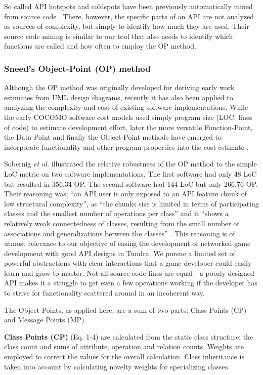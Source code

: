 \documentclass[conference]{IEEEtran}
\begin{document}
So called API hotspots and coldspots have been previously
automatically mined from source code \cite{spotweb}. There, however,
the specific parts of an API are not analyzed as sources of complexity,
but simply to identify how much they are used. Their source code
mining is similar to our tool that also needs to identify which
functions are called and how often to employ the OP method.

\subsubsection{Sneed's Object-Point (OP) method}

Although the OP method was originally developed for deriving early
work estimates from UML design diagrams, recently it has also been
applied to analyzing the complexity and cost of existing software
implementations. While the early COCOMO software cost models used
simply program size (LOC, lines of code) to estimate development
effort, later the more versatile Function-Point, the Data-Point and
finally the Object-Point methods have emerged to incorporate
functionality and other program properties into the cost estimate
\cite{henrich97repositorybased}.

Sobernig \emph{et al.} illustrated the relative robustness of the OP
method to the simple LoC metric on two software implementations. The
first software had only 48 LoC but resulted in 356.34 OP. The second
software had 144 LoC but only 266.76 OP. Their reasoning was: “an API
user is only exposed to an API feature chunk of low structural
complexity”, as “the chunks size is limited in terms of participating
classes and the smallest number of operations per class” and it “shows
a relatively weak connectedness of classes, resulting from the small
number of associations and generalizations between the classes”
\cite{api-complexity-analysis}. This reasoning is of utmost relevance
to our objective of easing the development of networked game
development with good API designs in Tundra. We pursue a limited set
of powerful abstractions with clear interactions that a game developer
could easily learn and grow to master. Not all source code lines are
equal - a poorly designed API makes it a struggle to get even a few
operations working if the developer has to strive for functionality
scattered around in an incoherent way.

The Object-Points, as applied here, are a sum of two parts: Class
Points (CP) and Message Points (MP).

\textbf{Class Points (CP)} (Eq. 1-4) are calculated from the static class structure: the
class count and sums of attribute, operation and relation
counts. Weights are employed to correct the values for the overall
calculation. Class inheritance is taken into account by calculating
novelty weights for specializing classes.
\end{document}
